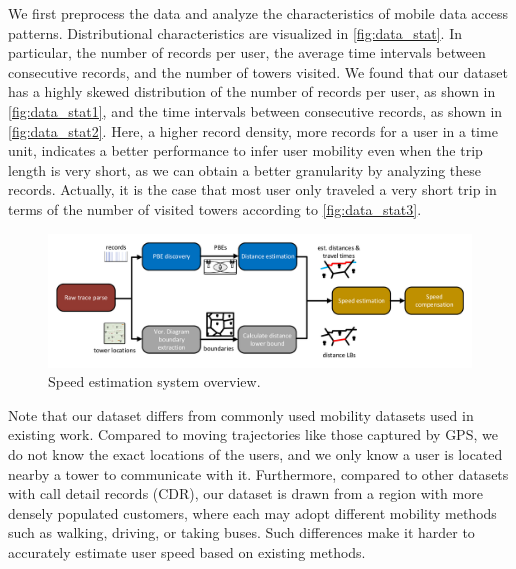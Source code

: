 We first preprocess the data and analyze the characteristics of mobile data access patterns.  %
Distributional characteristics are visualized in \autoref{fig:data_stat}.
In particular,
the number of records per user,
the average time intervals between consecutive records, and
the number of towers visited.
We found that our dataset has a highly skewed distribution of
the number of records per user, as shown in \autoref{fig:data_stat1}, and
the time intervals between consecutive records, as shown in \autoref{fig:data_stat2}.
Here, a higher record density, \ie more records for a user in a time unit, indicates a better performance to infer user mobility even when the trip length is very short,
as we can obtain a better granularity by analyzing these records.
Actually, it is the case that most user only traveled a very short trip in terms of the number of visited towers according to \autoref{fig:data_stat3}.

\begin{figure}
    \centering
    \includegraphics[width=\linewidth]{./figures/system_overview.pdf}
    \vspace{-0.4in}
    \caption{Speed estimation system overview.}
    \label{fig:system_overview}
    \vspace{-0.1in}
\end{figure}

Note that our dataset differs from commonly used mobility datasets used in existing work.
Compared to moving trajectories like those captured by GPS,
we do not know the exact locations of the users, and we only know a user is located nearby a tower to communicate with it.
Furthermore, compared to other datasets with call detail records (CDR),
our dataset is drawn from a region with more densely populated customers, where each may adopt different mobility methods such as walking, driving, or taking buses.
Such differences make it harder to accurately estimate user speed based on existing methods. %



